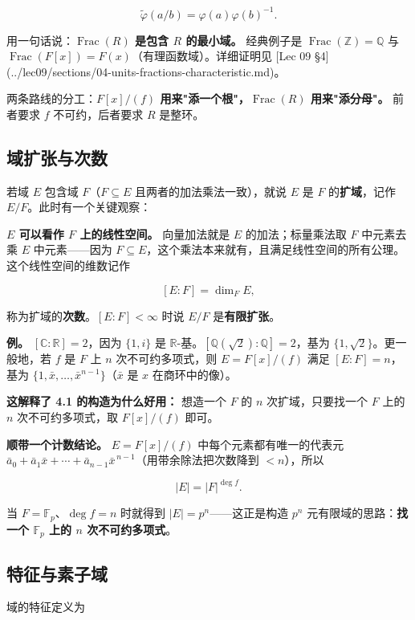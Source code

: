 \[
\widetilde{\varphi}(a/b)=\varphi(a)\varphi(b)^{-1}.
\]

用一句话说：\textbf{$\operatorname{Frac}(R)$ 是包含 $R$ 的最小域。} 经典例子是 $\operatorname{Frac}(\mathbb Z)=\mathbb Q$ 与 $\operatorname{Frac}(F[x])=F(x)$（有理函数域）。详细证明见 [Lec 09 §4](../lec09/sections/04-units-fractions-characteristic.md)。

两条路线的分工：\textbf{$F[x]/(f)$ 用来"添一个根"，$\operatorname{Frac}(R)$ 用来"添分母"。} 前者要求 $f$ 不可约，后者要求 $R$ 是整环。

\subsection{域扩张与次数}


若域 $E$ 包含域 $F$（$F\subseteq E$ 且两者的加法乘法一致），就说 $E$ 是 $F$ 的\textbf{扩域}，记作 $E/F$。此时有一个关键观察：

\textbf{$E$ 可以看作 $F$ 上的线性空间。} 向量加法就是 $E$ 的加法；标量乘法取 $F$ 中元素去乘 $E$ 中元素——因为 $F\subseteq E$，这个乘法本来就有，且满足线性空间的所有公理。这个线性空间的维数记作

\[
[E:F]=\dim_F E,
\]

称为扩域的\textbf{次数}。$[E:F]<\infty$ 时说 $E/F$ 是\textbf{有限扩张}。

\textbf{例。} $[\mathbb C:\mathbb R]=2$，因为 $\{1,i\}$ 是 $\mathbb R$-基。$[\mathbb Q(\sqrt2):\mathbb Q]=2$，基为 $\{1,\sqrt2\}$。更一般地，若 $f$ 是 $F$ 上 $n$ 次不可约多项式，则 $E=F[x]/(f)$ 满足 $[E:F]=n$，基为 $\{1,\bar x,\dots,\bar x^{n-1}\}$（$\bar x$ 是 $x$ 在商环中的像）。

\textbf{这解释了 4.1 的构造为什么好用：} 想造一个 $F$ 的 $n$ 次扩域，只要找一个 $F$ 上的 $n$ 次不可约多项式，取 $F[x]/(f)$ 即可。

\textbf{顺带一个计数结论。} $E=F[x]/(f)$ 中每个元素都有唯一的代表元 $\bar a_0+\bar a_1\bar x+\cdots+\bar a_{n-1}\bar x^{\,n-1}$（用带余除法把次数降到 $<n$），所以

\[
|E|=|F|^{\deg f}.
\]

当 $F=\mathbb F_p$、$\deg f=n$ 时就得到 $|E|=p^n$——这正是构造 $p^n$ 元有限域的思路：\textbf{找一个 $\mathbb F_p$ 上的 $n$ 次不可约多项式}。

\subsection{特征与素子域}


域的特征定义为

